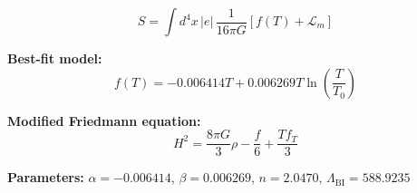 
\begin{equation}
  S = \int d^4x \, |e| \, \frac{1}{16\pi G} \left[ f(T) + \mathcal{L}_m \right]
\end{equation}

\textbf{Best-fit model:}
\begin{equation}
  f(T) = -0.006414 T + 0.006269 T \ln\!\left(\frac{T}{T_0}\right)
\end{equation}

\textbf{Modified Friedmann equation:}
\begin{equation}
  H^2 = \frac{8\pi G}{3} \rho - \frac{f}{6} + \frac{T f_T}{3}
\end{equation}

\textbf{Parameters:}
$\alpha = -0.006414$, \quad
$\beta = 0.006269$, \quad
$n = 2.0470$, \quad
$\Lambda_{\text{BI}} = 588.9235$